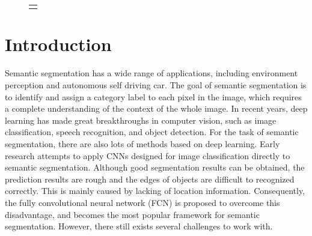 \documentclass[10.5pt,compsoc]{TsT}
\newcommand{\upcite}[1]{\superscript{\textsuperscript{\cite{#1}}}}
\theoremstyle{mystyle}
\newcommand{\upcite}[1]{\textsuperscript{\cite{#1}}}
\begin{document}
{\begin{strip}
\vskip -3mm
\end{strip}


\thispagestyle{plain}%
\thispagestyle{empty}%
\makeatother
\pagestyle{tstheadings}

\begin{figure}[b]
\vskip -6mm
\begin{tabular}{p{44mm}}
\toprule\\
\end{tabular}
\vskip -4.5mm
\noindent
\setlength{\tabcolsep}{1pt}
%
\end{figure}



\section{Introduction}
\label{s:introduction}
\noindent

Semantic segmentation has a wide range of applications, including environment perception and autonomous self driving car. The goal of semantic segmentation is to identify and assign a category label to each pixel in the image, which requires a complete understanding of the context of the whole image. In recent years, deep learning has made great breakthroughs in computer vision, such as image classification\upcite{1}, speech recognition\upcite{2}, and object detection\upcite{3}. For the task of semantic segmentation, there are also lots of methods based on deep learning. Early research attempts to apply CNNs designed for image classification directly to semantic segmentation. Although good segmentation results can be obtained, the prediction results are rough and the edges of objects are difficult to recognized correctly. This is mainly caused by lacking of location information. Consequently, the fully convolutional neural network (FCN)\upcite{4} is proposed to overcome this disadvantage, and becomes the most popular framework for semantic segmentation. However, there still exists several challenges to work with.

}
\end{document}
